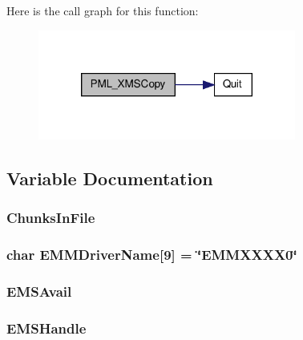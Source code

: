 Here is the call graph for this function:
\nopagebreak
\begin{figure}[H]
\begin{center}
\leavevmode
\includegraphics[width=240pt]{ID__PM_8C_adbf449e02e6c97248f39c51e8ced3238_cgraph}
\end{center}
\end{figure}




\subsection{Variable Documentation}
\hypertarget{ID__PM_8C_af385634b054d3e3d81d85865b3d7e71e}{
\subsubsection[{ChunksInFile}]{ {\bf ChunksInFile}}}
\label{ID__PM_8C_af385634b054d3e3d81d85865b3d7e71e}
\hypertarget{ID__PM_8C_a6afdcc6dd0066167eb94a8109a9940b1}{
\subsubsection[{EMMDriverName}]{\setlength{\rightskip}{0pt plus 5cm}char {\bf EMMDriverName}\mbox{[}9\mbox{]} = \char`\"{}EMMXXXX0\char`\"{}}}
\label{ID__PM_8C_a6afdcc6dd0066167eb94a8109a9940b1}
\hypertarget{ID__PM_8C_a070c70008059f6ed164c4baa34d84f2a}{
\subsubsection[{EMSAvail}]{ {\bf EMSAvail}}}
\label{ID__PM_8C_a070c70008059f6ed164c4baa34d84f2a}
\hypertarget{ID__PM_8C_a99b4bb7b9ffe9727ddd4bd4d7a586e0a}{
\subsubsection[{EMSHandle}]{ {\bf EMSHandle}}}
